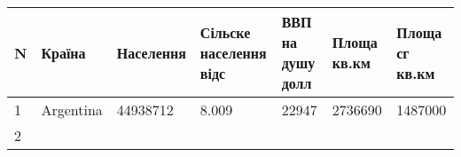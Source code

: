 \documentclass[
]{article}
\begin{document}
\begin{longtable}[]{@{}lllllll@{}}
\toprule
\begin{minipage}[b]{0.06\columnwidth}\raggedright
N\strut
\end{minipage} & \begin{minipage}[b]{0.15\columnwidth}\raggedright
Країна\strut
\end{minipage} & \begin{minipage}[b]{0.13\columnwidth}\raggedright
Населення\strut
\end{minipage} & \begin{minipage}[b]{0.13\columnwidth}\raggedright
Сільске населення відс\strut
\end{minipage} & \begin{minipage}[b]{0.09\columnwidth}\raggedright
ВВП на душу долл\strut
\end{minipage} & \begin{minipage}[b]{0.12\columnwidth}\raggedright
Площа кв.км\strut
\end{minipage} & \begin{minipage}[b]{0.12\columnwidth}\raggedright
Площа сг кв.км\strut
\end{minipage}\tabularnewline
\midrule
\endhead
\begin{minipage}[t]{0.06\columnwidth}\raggedright
1\strut
\end{minipage} & \begin{minipage}[t]{0.15\columnwidth}\raggedright
Argentina\strut
\end{minipage} & \begin{minipage}[t]{0.13\columnwidth}\raggedright
44938712\strut
\end{minipage} & \begin{minipage}[t]{0.13\columnwidth}\raggedright
8.009\strut
\end{minipage} & \begin{minipage}[t]{0.09\columnwidth}\raggedright
22947\strut
\end{minipage} & \begin{minipage}[t]{0.12\columnwidth}\raggedright
2736690\strut
\end{minipage} & \begin{minipage}[t]{0.12\columnwidth}\raggedright
1487000\strut
\end{minipage}\tabularnewline
\begin{minipage}[t]{0.06\columnwidth}\raggedright
2\strut
\end{minipage} & \begin{minipage}[t]{0.15\columnwidth}\raggedright

\end{minipage}
\end{longtable}
\end{document}
